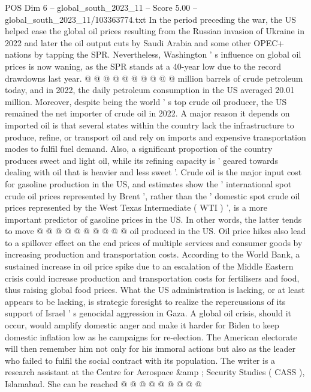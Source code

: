 \begin{textsample}{POS Dim 6 – global\_south\_2023\_11 – Score 5.00 – global\_south\_2023\_11/103363774.txt}
In the period preceding the war, the US helped ease the global oil prices resulting from the Russian invasion of Ukraine in 2022 and later the oil output cuts by Saudi Arabia and some other OPEC+ nations by tapping the SPR.
Nevertheless, Washington ' s influence on global oil prices is now waning, as the SPR stands at a 40-year low due to the record drawdowns last year. @ @ @ @ @ @ @ @ @ @ million barrels of crude petroleum today, and in 2022, the daily petroleum consumption in the US averaged 20.01 million.
Moreover, despite being the world ' s top crude oil producer, the US remained the net importer of crude oil in 2022.
A major reason it depends on imported oil is that several states within the country lack the infrastructure to produce, refine, or transport oil and rely on imports and expensive transportation modes to fulfil fuel demand.
Also, a significant proportion of the country produces sweet and light oil, while its refining capacity is ' geared towards dealing with oil that is heavier and less sweet '.
Crude oil is the major input cost for gasoline production in the US, and estimates show the ' international spot crude oil prices represented by Brent ', rather than the ' domestic spot crude oil prices represented by the West Texas Intermediate ( WTI ) ', is a more important predictor of gasoline prices in the US.
In other words, the latter tends to move @ @ @ @ @ @ @ @ @ @ oil produced in the US.
Oil price hikes also lead to a spillover effect on the end prices of multiple services and consumer goods by increasing production and transportation costs.
According to the World Bank, a sustained increase in oil price spike due to an escalation of the Middle Eastern crisis could increase production and transportation costs for fertilisers and food, thus raising global food prices.
What the US administration is lacking, or at least appears to be lacking, is strategic foresight to realize the repercussions of its support of Israel ' s genocidal aggression in Gaza.
A global oil crisis, should it occur, would amplify domestic anger and make it harder for Biden to keep domestic inflation low as he campaigns for re-election.
The American electorate will then remember him not only for his immoral actions but also as the leader who failed to fulfil the social contract with its population.
The writer is a research assistant at the Centre for Aerospace \&amp ; Security Studies ( CASS ), Islamabad.
She can be reached @ @ @ @ @ @ @ @ @

\end{textsample}
